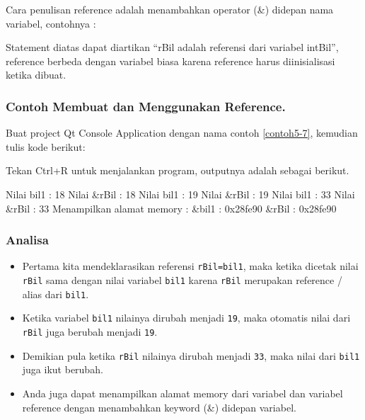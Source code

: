 Cara penulisan reference adalah menambahkan operator (\&) didepan nama
variabel, contohnya :



Statement diatas dapat diartikan ``rBil adalah referensi dari variabel
intBil'', reference berbeda dengan variabel biasa karena reference harus
diinisialisasi ketika dibuat.

\subsubsection*{Contoh  Membuat dan Menggunakan Reference.}

Buat project Qt Console Application dengan nama contoh \ref{contoh5-7}, kemudian tulis
kode berikut:



Tekan Ctrl+R untuk menjalankan program, outputnya adalah sebagai
berikut.

\begin{lcverbatim}
Nilai bil1 : 18
Nilai &rBil : 18
Nilai bil1 : 19
Nilai &rBil : 19
Nilai bil1 : 33
Nilai &rBil : 33
Menampilkan alamat memory :
&bil1 : 0x28fe90
&rBil : 0x28fe90
\end{lcverbatim}

\subsubsection*{Analisa}

\begin{itemize}

\item
  Pertama kita mendeklarasikan referensi \texttt{rBil=bil1}, maka ketika
  dicetak nilai \texttt{rBil} sama dengan nilai variabel \texttt{bil1}
  karena \texttt{rBil} merupakan reference / alias dari \texttt{bil1}.
\item
  Ketika variabel \texttt{bil1} nilainya dirubah menjadi \texttt{19},
  maka otomatis nilai dari \texttt{rBil} juga berubah menjadi
  \texttt{19}.
\item
  Demikian pula ketika \texttt{rBil} nilainya dirubah menjadi
  \texttt{33}, maka nilai dari \texttt{bil1} juga ikut berubah.
\item
  Anda juga dapat menampilkan alamat memory dari variabel dan variabel
  reference dengan menambahkan keyword (\&) didepan variabel.
\end{itemize}

